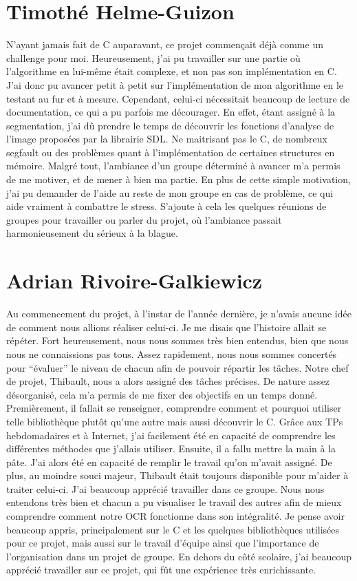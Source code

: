 \section{Timothé Helme-Guizon}

N’ayant jamais fait de C auparavant, ce projet commençait déjà comme un
challenge pour moi. Heureusement, j’ai pu travailler sur une partie où
l’algorithme en lui-même était complexe, et non pas son implémentation en C.
J’ai donc pu avancer petit à petit sur l’implémentation de mon algorithme en le
testant au fur et à mesure. Cependant, celui-ci nécessitait beaucoup de lecture
de documentation, ce qui a pu parfois me décourager. En effet, étant assigné à
la segmentation, j’ai dû prendre le temps de découvrir les fonctions d’analyse
de l’image proposées par la librairie SDL. Ne maitrisant pas le C, de nombreux
segfault ou des problèmes quant à l’implémentation de certaines structures en
mémoire. Malgré tout, l’ambiance d’un groupe déterminé à avancer m’a permis de
me motiver, et de mener à bien ma partie. En plus de cette simple motivation,
j’ai pu demander de l’aide au reste de mon groupe en cas de problème, ce qui
aide vraiment à combattre le stress. S’ajoute à cela les quelques réunions de
groupes pour travailler ou parler du projet, où l’ambiance passait
harmonieusement du sérieux à  la blague.

\section{Adrian Rivoire-Galkiewicz}

Au commencement du projet, à l’instar de l’année dernière, je n’avais aucune
idée de comment nous allions réaliser celui-ci. Je me disais que l’histoire
allait se répéter. Fort heureusement, nous nous sommes très bien entendus, bien
que nous nous ne connaissions pas tous. Assez rapidement, nous nous sommes
concertés pour “évaluer” le niveau de chacun afin de pouvoir répartir les
tâches. Notre chef de projet, Thibault, nous a alors assigné des tâches
précises. De nature assez désorganisé, cela m’a permis de me fixer des objectifs
en un temps donné. Premièrement, il fallait se renseigner, comprendre comment et
pourquoi utiliser telle bibliothèque plutôt qu’une autre mais aussi découvrir le
C. Grâce aux TPs hebdomadaires et à Internet, j’ai facilement été en capacité de
comprendre les différentes méthodes que j’allais utiliser. Ensuite, il a fallu
mettre la main à la pâte. J’ai alors été en capacité de remplir le travail qu’on
m’avait assigné. De plus, au moindre souci majeur, Thibault était toujours
disponible pour m’aider à traiter celui-ci. J’ai beaucoup apprécié travailler
dans ce groupe. Nous nous entendons très bien et chacun a pu visualiser le
travail des autres afin de mieux comprendre comment notre OCR fonctionne dans
son intégralité. Je pense avoir beaucoup appris, principalement sur le C et les
quelques bibliothèques utilisées pour ce projet, mais aussi sur le travail
d’équipe ainsi que l’importance de l’organisation dans un projet de groupe. En
dehors du côté scolaire, j’ai beaucoup apprécié travailler sur ce projet, qui
fût une expérience très enrichissante.

